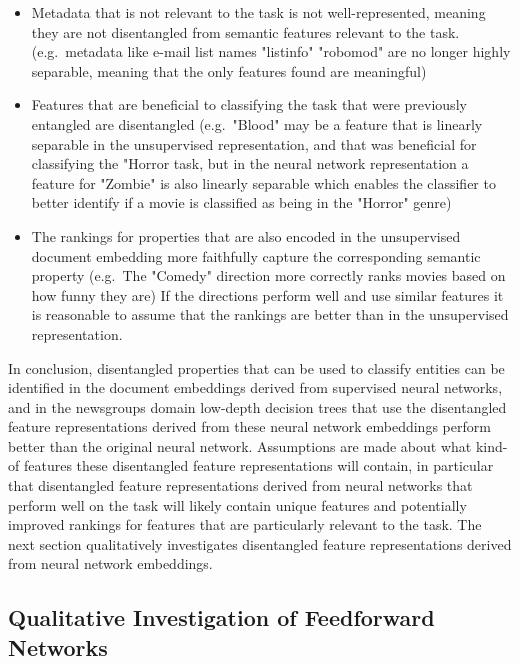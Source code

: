 \begin{itemize}
	\item Metadata that is not relevant to the task is not well-represented, meaning they are not disentangled from semantic features relevant to the task. (e.g.\ metadata like e-mail list names "listinfo" "robomod" are no longer highly separable, meaning that the only features found are meaningful)
	\item Features that are beneficial to classifying the task that were previously entangled are disentangled  (e.g.\ "Blood" may be a feature that is linearly separable in the unsupervised representation, and that was beneficial for classifying the "Horror task, but in the neural network representation a feature for "Zombie" is also linearly separable which enables the classifier to better identify if a movie is classified as being in the "Horror" genre)
	\item The rankings for properties that are also encoded in the unsupervised document embedding more faithfully capture the corresponding semantic property (e.g.\ The "Comedy" direction more correctly ranks movies based on how funny they are) If the directions perform well and use similar features it is reasonable to assume that the rankings are better than in the unsupervised representation.
\end{itemize}

In conclusion, disentangled properties that can be used to classify entities can be identified in the document embeddings derived from supervised neural networks, and in the newsgroups domain  low-depth decision trees that use the disentangled feature representations derived from these neural network embeddings perform  better than the original neural network. Assumptions are made about what kind-of features these disentangled feature representations will contain, in particular that disentangled feature representations derived from neural networks that perform well on the task will likely contain unique features and potentially improved rankings for features that are particularly relevant to the task.  The next section qualitatively investigates  disentangled feature representations derived from neural network  embeddings.

\subsection{Qualitative Investigation of Feedforward Networks}\label{ch5:qual}


